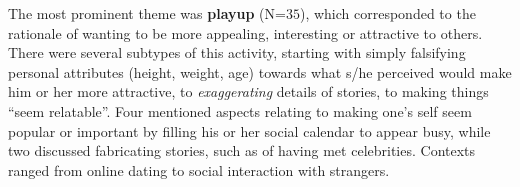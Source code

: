 \documentclass{sig-alternate}
\begin{document}


The most prominent theme was \textbf{playup} (N=$35$), which corresponded to the rationale of wanting to be more appealing, interesting or attractive to others.  There were several subtypes of this activity, starting with simply falsifying personal attributes (height, weight, age) towards what s/he perceived would make him or her more attractive, to \emph{exaggerating} details of stories, to making things ``seem relatable''. Four mentioned aspects relating to making one's self seem popular or important by filling his or her social calendar to appear busy, while two discussed fabricating stories, such as of having met celebrities.  Contexts ranged from online dating to social interaction with strangers. 
\end{document}
